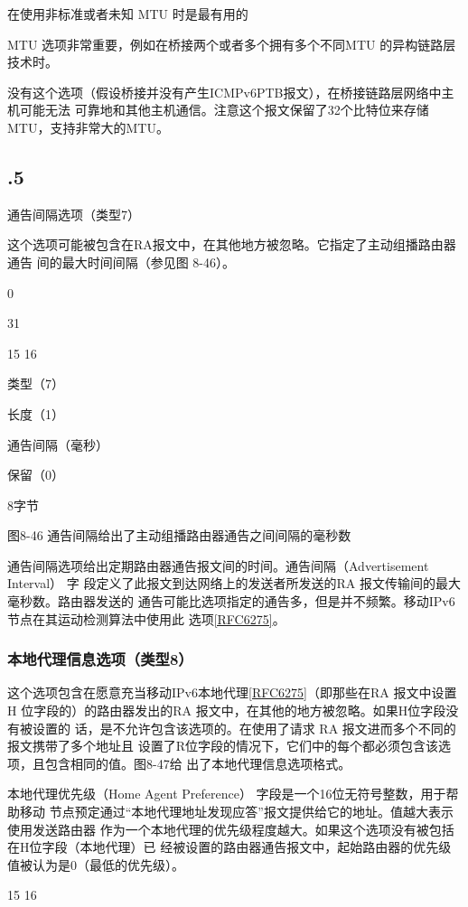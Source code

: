 在使用非标准或者未知 MTU 时是最有用的

MTU 选项非常重要，例如在桥接两个或者多个拥有多个不同MTU 的异构链路层技术时。

没有这个选项（假设桥接并没有产生ICMPv6PTB报文），在桥接链路层网络中主机可能无法
可靠地和其他主机通信。注意这个报文保留了32个比特位来存储 MTU，支持非常大的MTU。
\subsection{.5}
通告间隔选项（类型7）

这个选项可能被包含在RA报文中，在其他地方被忽略。它指定了主动组播路由器通告
间的最大时间间隔（参见图 8-46）。

0

31

15 16

类型（7）

长度（1）

通告间隔（毫秒）

保留（0）

8字节

图8-46 通告间隔给出了主动组播路由器通告之间间隔的毫秒数

通告间隔选项给出定期路由器通告报文间的时间。通告间隔（Advertisement Interval） 字
段定义了此报文到达网络上的发送者所发送的RA 报文传输间的最大毫秒数。路由器发送的
通告可能比选项指定的通告多，但是并不频繁。移动IPv6节点在其运动检测算法中使用此
选项\href{https://www.rfc-editor.org/rfc/rfc6275}{[RFC6275]}。

\subsubsection{本地代理信息选项（类型8）}
这个选项包含在愿意充当移动IPv6本地代理\href{https://www.rfc-editor.org/rfc/rfc6275}{[RFC6275]}（即那些在RA 报文中设置H
位字段的）的路由器发出的RA 报文中，在其他的地方被忽略。如果H位字段没有被设置的
话，是不允许包含该选项的。在使用了请求 RA 报文进而多个不同的报文携带了多个地址且
设置了R位字段的情况下，它们中的每个都必须包含该选项，且包含相同的值。图8-47给
出了本地代理信息选项格式。

本地代理优先级（Home Agent Preference） 字段是一个16位无符号整数，用于帮助移动
节点预定通过“本地代理地址发现应答”报文提供给它的地址。值越大表示使用发送路由器
作为一个本地代理的优先级程度越大。如果这个选项没有被包括在H位字段（本地代理）已
经被设置的路由器通告报文中，起始路由器的优先级值被认为是0（最低的优先级）。

15 16

